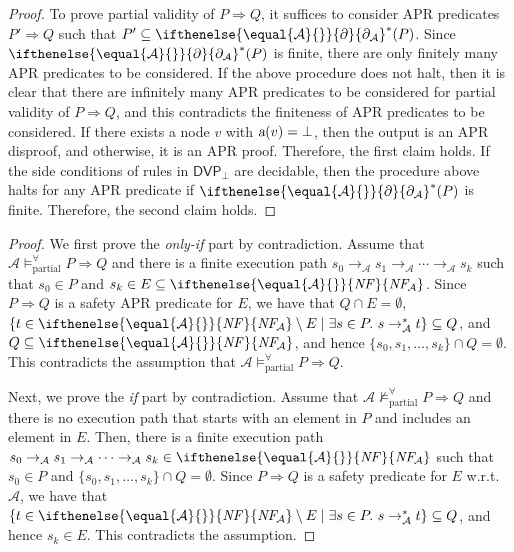 \documentclass[10pt,a4paper]{article}
\def\cA{\mathcal{A}}
\def\cR{\mathcal{R}}
\newcommand{\NF}[1][]{\ifthenelse{\equal{#1}{}}{\mathit{NF}}{\mathit{NF\!}_{#1}}}
\newcommand{\ReachPred}[2]{#1 \Rightarrow #2}
\newcommand{\Derivative}[1][\cR]{\ifthenelse{\equal{#1}{}}{\partial}{\partial_{#1}}}
\newcommand{\Valid}[3]{#2 \mathrel{\mathrel{\models^\forall_{\mathrm{#1}}}} #3}
\newcommand{\NotValid}[3]{#2 \mathrel{\mathrel{\not\models^\forall_{\mathrm{#1}}}} #3}
\newcommand{\PartiallyValid}[2][\cA]{\Valid{partial}{#1}{#2}}
\newcommand{\NotPartiallyValid}[2][\cA]{\NotValid{partial}{#1}{#2}}
\newcommand{\CDVPnew}[1][]{\mathsf{DVP}_\bot}
\newcommand{\varsl}[1]{\mbox{\sl #1}}
\begin{document}
\begin{proof}
	To prove partial validity of $\ReachPred{P}{Q}$, it suffices to consider APR predicates $\ReachPred{P'}{Q}$ such that $P' \subseteq \Derivative[\cA]^*(P)$.
	Since $\Derivative[\cA]^*(P)$ is finite, there are only finitely many APR predicates to be considered.
	If the above procedure does not halt, then it is clear that there are infinitely many APR predicates to be considered for partial validity of $\ReachPred{P}{Q}$, and this contradicts the finiteness of APR predicates to be considered.
	If there exists a node $v$ with $\varsl{a}(v) = \bot$, then the output is an APR disproof, and otherwise, it is an APR proof.
	Therefore, the first claim holds.
	If the side conditions of rules in $\CDVPnew$ are decidable, then the procedure above halts for any APR predicate if $\Derivative[\cA]^*(P)$ is finite.
	Therefore,
	the second claim holds.
\end{proof}

\ThmPartiallyValidSafetyProperties*
\begin{proof}
	We
	first
	prove the \textit{only-if} part by contradiction.
	Assume that $\PartiallyValid{\ReachPred{P}{Q}}$ and there is a finite execution path $s_0 \to_\cA s_1 \to_\cA \cdots \to_\cA s_k$
	such that $s_0 \in P$ and $s_k \in E \subseteq \NF[\cA]$.
	Since $\ReachPred{P}{Q}$ is a safety APR predicate for $E$, we have that $Q \cap E = \emptyset$, $\{ t \in \NF[\cA] \setminus E \mid \exists s \in P.\ s \to_\cA^* t \} \subseteq Q$, and $Q \subseteq \NF[\cA]$, and hence
	$\{s_0,s_1,\ldots,s_k\} \cap Q = \emptyset$.
	This contradicts the assumption that $\PartiallyValid{\ReachPred{P}{Q}}$.

	Next, we prove the \textit{if} part by contradiction.
	Assume that
	$\NotPartiallyValid{\ReachPred{P}{Q}}$
	and there is no execution path that starts with an element in $P$ and includes an element in $E$.
	Then,
	there is a finite execution path $s_0 \to_\cA s_1 \to_\cA \cdots \to_\cA s_k \in \NF[\cA]$ such that
	$s_0 \in P$ and
	$\{s_0,s_1,\ldots,s_k\} \cap Q = \emptyset$.
	Since $\ReachPred{P}{Q}$ is a safety predicate for $E$ w.r.t.\ $\cA$, we have that $\{ t \in \NF[\cA] \setminus E \mid \exists s \in P.\ s \to_\cA^* t \} \subseteq Q$, and hence $s_k \in E$.
	This contradicts the assumption.
\end{proof}
\end{document}
